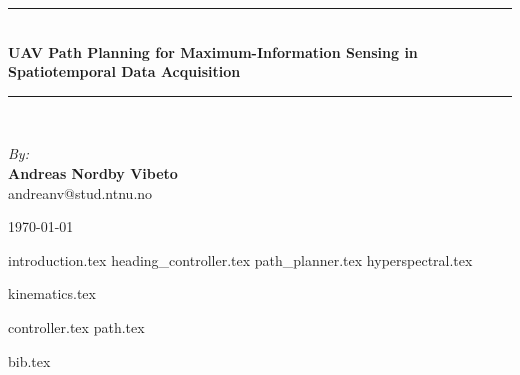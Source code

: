 \documentclass{article}
\newcommand{\HRule}{\rule{\linewidth}{0.5mm}}
\numberwithin{equation}{section}
\begin{document}
\begin{center}
\HRule \\[0.4cm]
{ \huge \bfseries UAV Path Planning for Maximum-Information Sensing in Spatiotemporal Data Acquisition}
\HRule \\[1.5cm]

\begin{center} \large
\emph{By:}\\
\textbf{Andreas Nordby Vibeto}\\
andreanv@stud.ntnu.no
\end{center}

\vfill

{\large \monthyear\today}

\end{center}
\newpage
{}

{introduction.tex}
{heading_controller.tex}
{path_planner.tex}
{hyperspectral.tex}

{kinematics.tex}

{controller.tex}
{path.tex}




\newpage
{bib.tex}
\end{document}
